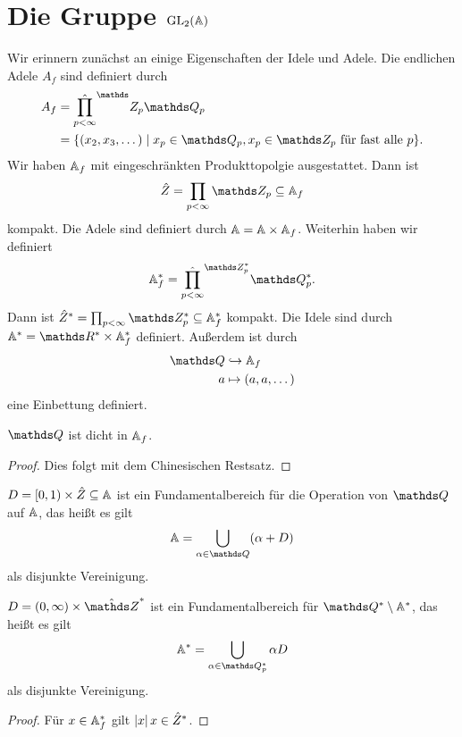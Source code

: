 \chapter{Die Gruppe $\operatorname{GL}_2(\mathbb{A})$}
Wir erinnern zunächst an einige Eigenschaften der Idele und Adele.
Die endlichen Adele $A_f$ sind definiert durch
\begin{align*}
A_f&=\hat{\prod_{p<\infty}}^\Z_p \Q_p\\
&=\{(x_2,x_3,\dots) \mid x_p \in \Q_p, x_p\in \Z_p \text{ für fast alle } p\}.
\end{align*}
Wir haben $\mathbb{A}_f$ mit eingeschränkten Produkttopolgie ausgestattet.
Dann ist
\begin{align*}
\hat{Z}=\prod_{p <\infty} \Z_p \subseteq \A_f
\end{align*}
kompakt.
Die Adele sind definiert durch $\mathbb{A}=\mathbb{A} \times \mathbb{A}_f$.
Weiterhin haben wir definiert
\begin{align*}
\A_f^\ast= \hat{\prod_{p<\infty}}^{\Z_p^\ast} \Q_p^\ast.
\end{align*}
Dann ist $\hat{Z}^\ast=\prod_{p<\infty} \Z_p^\ast \subseteq \A_f^\ast$ kompakt.
Die Idele sind durch $\A^\ast=\R^\ast \times \A_f^\ast$ definiert.
Außerdem ist durch
\begin{align*}
\Q &\hookrightarrow \A_f\\
a&\mapsto (a,a,\dots)
\end{align*}
eine Einbettung definiert.
\begin{prop}
$\Q$ ist dicht in $\mathbb{A}_f$.
\end{prop}
\begin{proof}
Dies folgt mit dem Chinesischen Restsatz.
\end{proof}
\begin{prop}
$D=[0,1)\times \hat{Z}\subseteq \mathbb{A}$ ist ein Fundamentalbereich für die
Operation von $\Q$ auf $\mathbb{A}$, das heißt es gilt
\begin{align*}
\A=\bigcup_{\alpha\in \Q} (\alpha+D)
\end{align*}
als disjunkte Vereinigung.
\end{prop}

\begin{prop}
$D=(0,\infty)\times\hat{\Z}^*$ ist ein Fundamentalbereich für $\Q^\ast \setminus \A^\ast$, das heißt es gilt
\begin{align*}
\A^\ast=\bigcup_{\alpha\in \Q_p^\ast} \alpha D
\end{align*}
als disjunkte Vereinigung.
\end{prop}
\begin{proof}
Für $x\in \mathbb{A}_f^\ast$ gilt $\left\vert x\right\vert x\in \hat{Z}^\ast$.
\end{proof}

